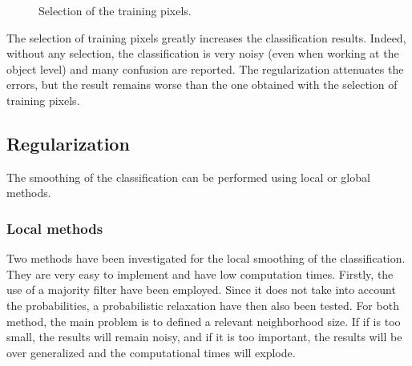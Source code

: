 \begin{figure}[htbp]
\begin{center}
{\label{subfig:C3_S3_ss3_sel_resultsc}
}
\hspace*{0.025\textwidth}
\endgroup
\caption{Selection of the training pixels.}
\label{fig:C3_S3_ss3_sel_results}
\end{center}
\end{figure}

The selection of training pixels greatly increases the classification results. Indeed, without any selection, the classification is very noisy (even when working at the object level) and many confusion are reported. The regularization attenuates the errors, but the result remains worse than the one obtained with the selection of training pixels.

\subsection{Regularization}
The smoothing of the classification can be performed using local or global methods.

\subsubsection{Local methods}
Two methods have been investigated for the local smoothing of the classification. They are very easy to implement and have low computation times.
Firstly, the use of a majority filter have been employed. Since it does not take into account the probabilities, a probabilistic relaxation have then also been tested. For both method, the main problem is to defined a relevant neighborhood size. If if is too small, the results will remain noisy, and if it is too important, the results will be over generalized and the computational times will explode.

